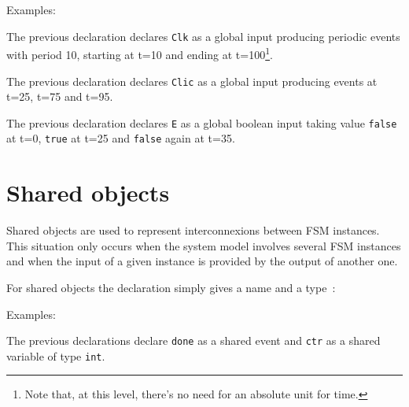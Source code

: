 \medskip
Examples:

\begin{center}
\end{center}

The previous declaration declares \verb|Clk| as a global input producing periodic events with period 10, starting
  at t=10 and ending at t=100\footnote{Note that, at this level, there's no need for an absolute
    unit for time.}.

\begin{center}
\end{center}

The previous declaration declares \verb|Clic| as a global input producing events at t=25, t=75 and
  t=95.

\begin{center}
\end{center}

The previous declaration declares \verb|E| as a global boolean input taking value \texttt{false} at
t=0, \texttt{true} at t=25 and \texttt{false} again at t=35.

\section{Shared objects}
\label{sec:shared}

Shared objects are used to represent interconnexions between FSM instances. This situation only
occurs when the system model involves several FSM instances and when the input of a given instance
is provided by the output of another one.

\medskip
\step For shared objects the declaration simply gives a name and a type~:

\begin{center}
\end{center}

\medskip
Examples:

\begin{center}

\end{center}

The previous declarations declare \verb|done| as a shared event and \texttt{ctr} as a shared
variable of type \texttt{int}.

